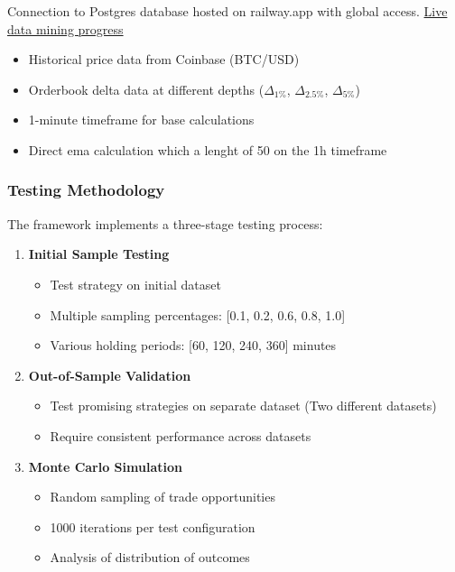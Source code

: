 \documentclass[12pt]{article}
\begin{document}
Connection to Postgres database hosted on railway.app with global access. \href{https://customchart-production.up.railway.app/#}{Live data mining progress}
\begin{itemize}
  \item Historical price data from Coinbase (BTC/USD)
  \item Orderbook delta data at different depths ($\Delta_{1\%}$, $\Delta_{2.5\%}$, $\Delta_{5\%}$)
  \item 1-minute timeframe for base calculations
  \item Direct ema calculation which a lenght of 50 on the 1h timeframe
\end{itemize}





\subsubsection*{Testing Methodology}
The framework implements a three-stage testing process:
\begin{enumerate}
  \item \textbf{Initial Sample Testing}
    \begin{itemize}
      \item Test strategy on initial dataset
      \item Multiple sampling percentages: [0.1, 0.2, 0.6, 0.8, 1.0]
      \item Various holding periods: [60, 120, 240, 360] minutes
    \end{itemize}
  
  \item \textbf{Out-of-Sample Validation}
    \begin{itemize}
      \item Test promising strategies on separate dataset (Two different datasets)
      \item Require consistent performance across datasets
    \end{itemize}
  
  \item \textbf{Monte Carlo Simulation}
    \begin{itemize}
      \item Random sampling of trade opportunities
      \item 1000 iterations per test configuration
      \item Analysis of distribution of outcomes
    \end{itemize}
\end{enumerate}
\end{document}
